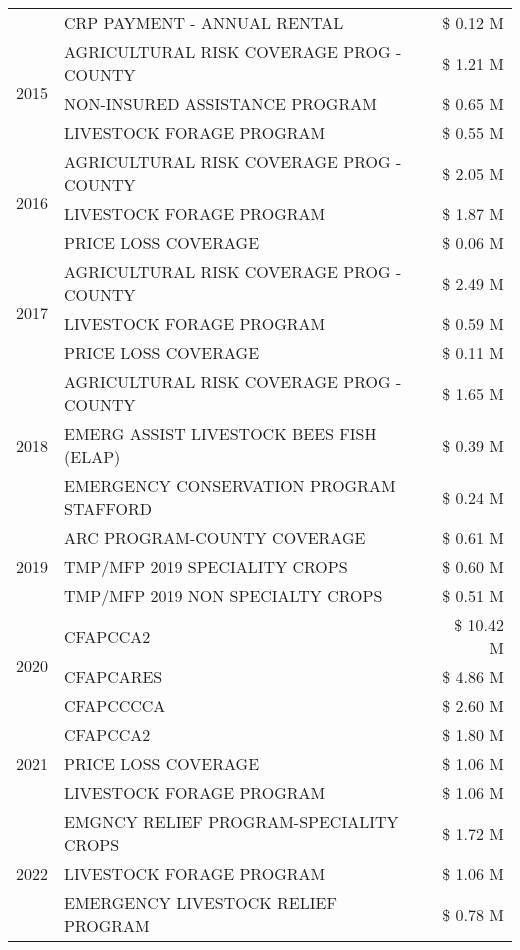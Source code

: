 \begin{tabular}{llr}
 & CRP PAYMENT - ANNUAL RENTAL & \$ 0.12 M \\
\cline{1-3}
\multirow[t]{3}{*}{2015} & AGRICULTURAL RISK COVERAGE PROG - COUNTY & \$ 1.21 M \\
 & NON-INSURED ASSISTANCE PROGRAM & \$ 0.65 M \\
 & LIVESTOCK FORAGE PROGRAM & \$ 0.55 M \\
\cline{1-3}
\multirow[t]{3}{*}{2016} & AGRICULTURAL RISK COVERAGE PROG - COUNTY & \$ 2.05 M \\
 & LIVESTOCK FORAGE PROGRAM & \$ 1.87 M \\
 & PRICE LOSS COVERAGE & \$ 0.06 M \\
\cline{1-3}
\multirow[t]{3}{*}{2017} & AGRICULTURAL RISK COVERAGE PROG - COUNTY & \$ 2.49 M \\
 & LIVESTOCK FORAGE PROGRAM & \$ 0.59 M \\
 & PRICE LOSS COVERAGE & \$ 0.11 M \\
\cline{1-3}
\multirow[t]{3}{*}{2018} & AGRICULTURAL RISK COVERAGE PROG - COUNTY & \$ 1.65 M \\
 & EMERG ASSIST LIVESTOCK BEES FISH (ELAP) & \$ 0.39 M \\
 & EMERGENCY CONSERVATION PROGRAM STAFFORD & \$ 0.24 M \\
\cline{1-3}
\multirow[t]{3}{*}{2019} & ARC PROGRAM-COUNTY COVERAGE & \$ 0.61 M \\
 & TMP/MFP 2019 SPECIALITY CROPS & \$ 0.60 M \\
 & TMP/MFP 2019 NON SPECIALTY CROPS & \$ 0.51 M \\
\cline{1-3}
\multirow[t]{3}{*}{2020} & CFAPCCA2 & \$ 10.42 M \\
 & CFAPCARES & \$ 4.86 M \\
 & CFAPCCCCA & \$ 2.60 M \\
\cline{1-3}
\multirow[t]{3}{*}{2021} & CFAPCCA2 & \$ 1.80 M \\
 & PRICE LOSS COVERAGE & \$ 1.06 M \\
 & LIVESTOCK FORAGE PROGRAM & \$ 1.06 M \\
\cline{1-3}
\multirow[t]{3}{*}{2022} & EMGNCY RELIEF PROGRAM-SPECIALITY CROPS & \$ 1.72 M \\
 & LIVESTOCK FORAGE PROGRAM & \$ 1.06 M \\
 & EMERGENCY LIVESTOCK RELIEF PROGRAM & \$ 0.78 M \\
\cline{1-3}
\bottomrule
\end{tabular}
